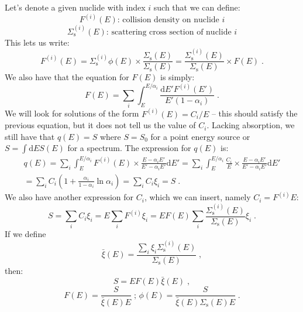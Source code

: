 Let's denote a given nuclide with index $i$ such that we can define:
\begin{equation*}
    F^{(i)}(E)\text{: collision density on nuclide }i
\end{equation*}
\begin{equation*}
    \Sigma^{(i)}_\mathrm{s}(E)\text{: scattering cross section of nuclide }i
\end{equation*}
This lets us write:
\begin{equation*}
    F^{(i)}(E) = \Sigma^{(i)}_\mathrm{s}\phi(E) \times \frac{\Sigma_\mathrm{s}(E)}{\Sigma_\mathrm{s}(E)} = \frac{\Sigma^{(i)}_\mathrm{s}(E)}{\Sigma_\mathrm{s}(E)} \times F(E)\;\mathrm{.}
\end{equation*}
We also have that the equation for $F(E)$ is simply:
\begin{equation*}
    F(E) = \sum_i \int^{E/\alpha_i}_E\frac{\mathrm{d}E' F^{(i)}(E')}{E'(1-\alpha_i)}\;\mathrm{.}
\end{equation*}
We will look for solutions of the form $F^{(i)}(E) = C_i/E$ -- this should satisfy the previous equation, but it does not tell us the value of $C_i$. Lacking absorption, we still have that $q(E) = S$ where $S = S_0$ for a point energy source or $S=\int\mathrm{d}E S(E)$ for a spectrum. The expression for $q(E)$ is:
\begin{equation*}
\begin{split}
    q(E) = \sum_i \int^{E/\alpha_i}_{E}F^{(i)}(E) \times \frac{E-\alpha_i E'}{E' - \alpha_i E'}\mathrm{d}E' = \sum_i \int^{E/\alpha_i}_{E}\frac{C_i}{E} \times \frac{E-\alpha_i E'}{E' - \alpha_i E'}\mathrm{d}E'\\
    = \sum_i C_i \left(1 + \frac{\alpha_i}{1-\alpha_i}\ln\alpha_i\right) = \sum_i C_i \xi_i = S\;\mathrm{.}
    \end{split}
\end{equation*}
We also have another expression for $C_i$, which we can insert, namely $C_i = F^{(i)}E$:
\begin{equation*}
    S = \sum_i C_i\xi_i = E\sum_i F^{(i)}\xi_i = E F(E) \sum_i \frac{\Sigma^{(i)}_\mathrm{s}(E)}{\Sigma_\mathrm{s}(E)}\xi_i\;\mathrm{.}
\end{equation*}
If we define
\begin{equation*}
    \bar{\xi}(E)= \frac{\sum_i \xi_i \Sigma^{(i)}_\mathrm{s}(E)}{\Sigma_\mathrm{s}(E)}\;\mathrm{,}
\end{equation*}
then:
\begin{equation*}
    S = EF(E)\bar{\xi}(E)\;\mathrm{,}
\end{equation*}
\begin{equation*}
    F(E) = \frac{S}{\bar{\xi}(E) E}\;\text{;  } \phi(E) = \frac{S}{\bar{\xi}(E)\Sigma_\mathrm{s}(E) E}\;\mathrm{.}
\end{equation*}


